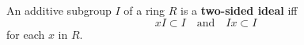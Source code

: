 An additive subgroup $I$ of a ring $R$ is a \textbf{two-sided ideal} iff
$$xI \subset I \quad \text{and} \quad Ix \subset I$$
for each $x$ in $R$.
